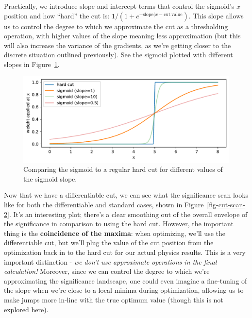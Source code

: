 \documentclass[
  11pt,
  numbers=noendperiod]{book}
\begin{document}
Practically, we introduce slope and intercept terms that control the
sigmoid's \(x\) position and how ``hard'' the cut is:
\(1/(1+e^{-\mathrm{slope}(x-\mathrm{cut~value}})\). This slope allows us
to control the degree to which we approximate the cut as a thresholding
operation, with higher values of the slope meaning less approximation
(but this will also increase the variance of the gradients, as we're
getting closer to the discrete situation outlined previously). See the
sigmoid plotted with different slopes in Figure~\ref{fig-sigmoid}.

\begin{figure}

{\centering \includegraphics{./diffprog-hep_files/figure-pdf/fig-sigmoid-output-1.pdf}

}

\caption{\label{fig-sigmoid}Comparing the sigmoid to a regular hard cut
for different values of the sigmoid slope.}

\end{figure}

Now that we have a differentiable cut, we can see what the significance
scan looks like for both the differentiable and standard cases, shown in
Figure~\ref{fig-cut-scan-2}. It's an interesting plot; there's a clear
smoothing out of the overall envelope of the significance in comparison
to using the hard cut. However, the important thing is the
\textbf{coincidence of the maxima}: when optimizing, we'll use the
differentiable cut, but we'll plug the value of the cut position from
the optimization back in to the hard cut for our actual physics results.
This is a very important distinction - \emph{we don't use approximate
operations in the final calculation!} Moreover, since we can control the
degree to which we're approximating the significance landscape, one
could even imagine a fine-tuning of the slope when we're close to a
local minima during optimization, allowing us to make jumps more in-line
with the true optimum value (though this is not explored here).
\end{document}

